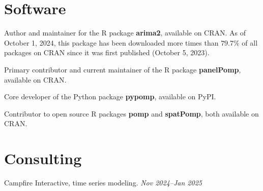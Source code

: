 \documentclass[11pt]{article}
\begin{document}
\section*{Software}

\noindent Author and maintainer for the R package \textbf{arima2}, available on CRAN. As of October 1, 2024, this package has been downloaded more times than $79.7\%$ of all packages on CRAN since it was first published (October 5, 2023).

\vspace{2mm}
\noindent Primary contributor and current maintainer of the R package \textbf{panelPomp}, available on CRAN.

\vspace{2mm}
\noindent Core developer of the Python package \textbf{pypomp}, available on PyPI.

\vspace{2mm}
\noindent Contributor to open source R packages \textbf{pomp} and \textbf{spatPomp}, both available on CRAN.

\section*{Consulting}

\noindent Campfire Interactive, time series modeling. \hfill  {\textit{Nov 2024--Jan 2025}}
\end{document}
